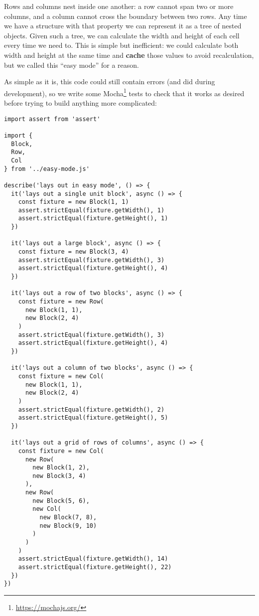 \documentclass[krantzl]{krantz}
\newcommand{\glossref}[1]{\textbf{#1}}
\newcommand{\hreffoot}[2]{{#1}\footnote{\href{#2}{#2}}}
\begin{document}
Rows and columns nest inside one another:
a row cannot span two or more columns,
and a column cannot cross the boundary between two rows.
Any time we have a structure with that property
we can represent it as a tree of nested objects.
Given such a tree,
we can calculate the width and height of each cell every time we need to.
This is simple but inefficient:
we could calculate both width and height at the same time
and \glossref{cache} those values to avoid recalculation,
but we called this “easy mode” for a reason.


As simple as it is,
this code could still contain errors (and did during development),
so we write some \hreffoot{Mocha}{https://mochajs.org/} tests to check that it works as desired
before trying to build anything more complicated:


\begin{lstlisting}[frame=tblr]
import assert from 'assert'

import {
  Block,
  Row,
  Col
} from '../easy-mode.js'

describe('lays out in easy mode', () => {
  it('lays out a single unit block', async () => {
    const fixture = new Block(1, 1)
    assert.strictEqual(fixture.getWidth(), 1)
    assert.strictEqual(fixture.getHeight(), 1)
  })

  it('lays out a large block', async () => {
    const fixture = new Block(3, 4)
    assert.strictEqual(fixture.getWidth(), 3)
    assert.strictEqual(fixture.getHeight(), 4)
  })

  it('lays out a row of two blocks', async () => {
    const fixture = new Row(
      new Block(1, 1),
      new Block(2, 4)
    )
    assert.strictEqual(fixture.getWidth(), 3)
    assert.strictEqual(fixture.getHeight(), 4)
  })

  it('lays out a column of two blocks', async () => {
    const fixture = new Col(
      new Block(1, 1),
      new Block(2, 4)
    )
    assert.strictEqual(fixture.getWidth(), 2)
    assert.strictEqual(fixture.getHeight(), 5)
  })

  it('lays out a grid of rows of columns', async () => {
    const fixture = new Col(
      new Row(
        new Block(1, 2),
        new Block(3, 4)
      ),
      new Row(
        new Block(5, 6),
        new Col(
          new Block(7, 8),
          new Block(9, 10)
        )
      )
    )
    assert.strictEqual(fixture.getWidth(), 14)
    assert.strictEqual(fixture.getHeight(), 22)
  })
})
\end{lstlisting}
\end{document}
